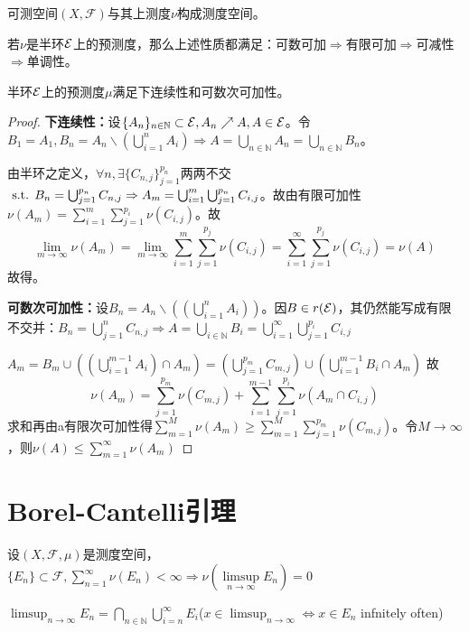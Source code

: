 \documentclass{ctexart}
\begin{document}
\begin{Def}[测度空间]
  可测空间$(X,\mathscr{F})$与其上测度$\nu$构成测度空间。
\end{Def}


若$\nu$是半环$\mathcal{E}$上的预测度，那么上述性质都满足：可数可加$\Rightarrow$有限可加$\Rightarrow$可减性$\Rightarrow$单调性。

\begin{Thm}
  半环$\mathcal{E}$上的预测度$\mu$满足下连续性和可数次可加性。
\end{Thm}


\begin{proof}
  \textbf{下连续性：}设$\{A_{n}\}_{n\in\mathbb{N}}\subset \mathcal{E},A_{n}\nearrow A,A\in\mathcal{E}$。令$B_{1}=A_{1},B_{n}=A_{n}\backslash (\bigcup_{i=1}^{n}A_{i})\Rightarrow A=\bigcup_{n\in\mathbb{N}}A_{n}=\bigcup_{n\in\mathbb{N}}B_{n}$。

  由半环之定义，$\forall n,\exists\{C_{n,j}\}_{j=1}^{p_{n}}$两两不交$\text{ s.t. } B_{n}=\bigcup_{j=1}^{p_{n}}C_{n,j}\Rightarrow A_{m}=\bigcup_{i=1}^{m}\bigcup_{j=1}^{p_{n}}C_{i,j}$。故由有限可加性$\nu(A_{m})=\sum_{i=1}^{m}\sum_{j=1}^{p_{i}}\nu(C_{i,j})$。故  
\[\lim_{m\to\infty}\nu(A_{m})=\lim_{m\to\infty}\sum_{i=1}^{m}\sum_{j=1}^{p_{j}}\nu(C_{i,j})=\sum_{i=1}^{\infty}\sum_{j=1}^{p_{j}}\nu(C_{i,j})=\nu(A)\]
故得。

\textbf{可数次可加性：}设$B_{n}=A_{n}\backslash ((\bigcup_{i=1}^{n}A_{i}))$。因$B\in r(\mathcal{E})$，其仍然能写成有限不交并：$B_{n}=\bigcup_{j=1}^{n}C_{n,j}\Rightarrow A=\bigcup_{i\in\mathbb{N}}B_{i}=\bigcup_{i=1}^{\infty}\bigcup_{j=1}^{p_{i}}C_{i,j}$

$A_{m}=B_{m}\cup((\bigcup_{i=1}^{m-1}A_{i})\cap A_{m})
=(\bigcup_{j=1}^{p_{m}}C_{m,j})\cup (\bigcup_{i=1}^{m-1}B_{i}\cap A_{m})$
故
\[\nu(A_{m})=\sum_{j=1}^{p_{m}}\nu(C_{m,j})+\sum_{i=1}^{m-1}\sum_{j=1}^{p_{i}}\nu(A_{m}\cap C_{i,j})
\]
求和再由a有限次可加性得$\sum_{m=1}^{M}\nu(A_{m})\geq \sum_{m=1}^{M}\sum_{j=1}^{p_{m}}\nu(C_{m,j})$。令$M\to\infty$，则$\nu(A)\leq \sum_{m=1}^{\infty}\nu(A_{m})$
\end{proof}

\section{Borel-Cantelli引理}
\begin{Thm}
  设$(X,\mathscr{F},\mu)$是测度空间，$\{E_{n}\}\subset\mathscr{F},\sum_{n=1}^{\infty}\nu(E_{n})<\infty\Rightarrow \nu(\limsup\limits_{n\to\infty}E_{n})=0$
\end{Thm}
$\limsup_{n\to\infty}E_{n}=\bigcap_{n\in\mathbb{N}}\bigcup_{i=n}^{\infty}E_{i}$($x\in\limsup_{n\to\infty}\Leftrightarrow x\in E_{n}$ infnitely often)
\end{document}
